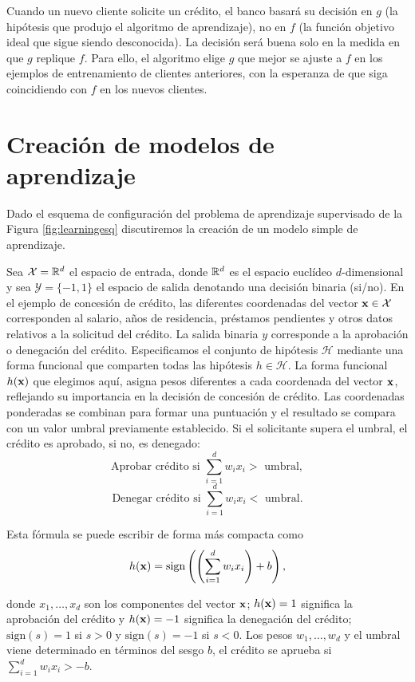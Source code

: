 \documentclass[oneside,openright,titlepage,numbers=noenddot,openany,headinclude,footinclude=true,
cleardoublepage=empty,abstractoff,BCOR=5mm,paper=a4,fontsize=12pt,main=spanish]{scrreprt}
\begin{document}
\clearpage

Cuando un nuevo cliente solicite un crédito, el banco basará su decisión en $g$ (la hipótesis que produjo el algoritmo de aprendizaje), no en $f$ (la
función objetivo ideal que sigue siendo desconocida). La decisión será buena solo en la medida en que $g$ replique $f$. Para ello, el algoritmo elige $g$ que mejor se ajuste a $f$ en los ejemplos de entrenamiento de clientes anteriores, con la esperanza de que siga coincidiendo con $f$ en los nuevos clientes.

\section{Creación de modelos de aprendizaje}

Dado el esquema de configuración del problema de aprendizaje supervisado de la Figura \ref{fig:learningesq} discutiremos la creación de un modelo simple de aprendizaje.

Sea $\mathcal{X}=\mathbb{R}^d$ el espacio de entrada, donde $\mathbb{R}^d$ es el espacio euclídeo $d$-dimensional y sea $\mathcal{Y}=\{-1,1\}$ el espacio de salida denotando una decisión binaria (si/no). En el ejemplo de concesión de crédito, las diferentes coordenadas del vector $\textbf{x}\in \mathcal{X}$ corresponden al salario, años de residencia, préstamos pendientes y otros datos relativos a la solicitud del crédito. La salida binaria $y$ corresponde a la aprobación o denegación del crédito. Especificamos el conjunto de hipótesis $\mathcal{H}$ mediante una forma funcional que comparten todas las hipótesis $h\in \mathcal{H}$. La forma funcional $h(\textbf{x})$ que elegimos aquí, asigna pesos diferentes a cada coordenada del vector $\textbf{x}$, reflejando su importancia en la decisión de concesión de crédito. Las coordenadas ponderadas se combinan para formar una puntuación y el resultado se compara con un valor umbral previamente establecido. Si el solicitante supera el umbral, el crédito es aprobado, si no, es denegado: $$\text{Aprobar crédito si } \sum_{i=1}^d w_ix_i > \text{ umbral},$$ $$\text{Denegar crédito si } \sum_{i=1}^d w_ix_i < \text{ umbral}.$$

Esta fórmula se puede escribir de forma más compacta como 
\begin{equation} \label{eq:sign-6}
h(\textbf{x})=\text{sign}\left(\left( \sum_{i=1}^d w_ix_i\right)+b \right),
\end{equation}


donde $x_1,\dots,x_d$ son los componentes del vector $\textbf{x}$; $h(\textbf{x})=1$ significa la aprobación del crédito y $h(\textbf{x})=-1$ significa la denegación del crédito; $\text{sign}(s)=1$ si $s>0$ y $\text{sign}(s)=-1$ si $s<0$. Los pesos $w_1,\dots,w_d$ y el umbral viene determinado en términos del sesgo $b$, el crédito se aprueba si $\displaystyle \sum_{i=1}^d w_ix_i > -b.$ 
\end{document}
